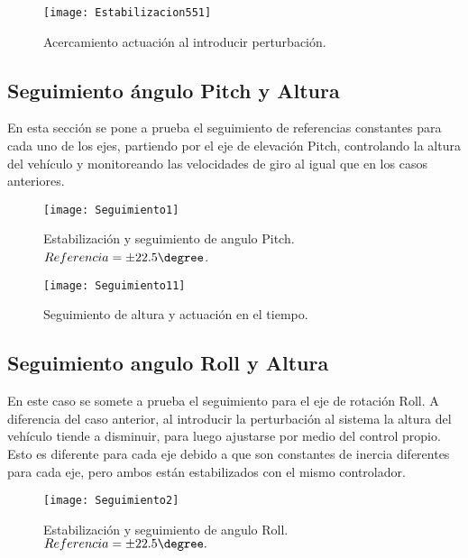 \documentclass[../main.tex]{subfiles}
\begin{document}
\begin{figure}[H]
\noindent \begin{centering}
\texttt{[image: Estabilizacion551]}
\par\end{centering}
\caption{Acercamiento actuación al introducir perturbación.}
\end{figure}

\subsection{Seguimiento ángulo Pitch y Altura}

En esta sección se pone a prueba el seguimiento de referencias constantes
para cada uno de los ejes, partiendo por el eje de elevación Pitch,
controlando la altura del vehículo y monitoreando las velocidades
de giro al igual que en los casos anteriores.

\begin{figure}[H]
\noindent \begin{centering}
\texttt{[image: Seguimiento1]}
\par\end{centering}
\caption{Estabilización y seguimiento de angulo Pitch. $Referencia=\pm22.5\degree$.}
\end{figure}

\begin{figure}[H]
\noindent \begin{centering}
\texttt{[image: Seguimiento11]}
\par\end{centering}
\caption{Seguimiento de altura y actuación en el tiempo.}
\end{figure}

\subsection{Seguimiento angulo Roll y Altura}

En este caso se somete a prueba el seguimiento para el eje de rotación
Roll. A diferencia del caso anterior, al introducir la perturbación
al sistema la altura del vehículo tiende a disminuir, para luego ajustarse
por medio del control propio. Esto es diferente para cada eje debido
a que son constantes de inercia diferentes para cada eje, pero ambos
están estabilizados con el mismo controlador.

\begin{figure}[H]
\noindent \begin{centering}
\texttt{[image: Seguimiento2]}
\par\end{centering}
\caption{Estabilización y seguimiento de angulo Roll. $Referencia=\pm22.5\degree.$ }
\end{figure}
\end{document}
